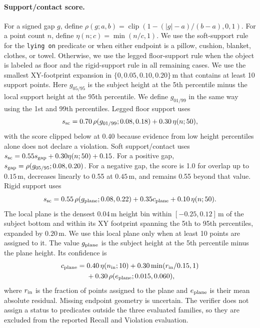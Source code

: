 \paragraph{Support/contact score.}
For a signed gap \(g\), define
\(\rho(g;a,b)=\operatorname{clip}(1-(|g|-a)/(b-a),0,1)\). For a point count \(n\), define \(\eta(n;c)=\min(n/c,1)\).
We use the soft-support rule for the \texttt{lying on} predicate or when either endpoint is a pillow, cushion, blanket, clothes, or towel. Otherwise, we use the legged floor-support rule when the object is labeled as floor and the rigid-support rule in all remaining cases.
We use the smallest XY-footprint expansion in \(\{0,0.05,0.10,0.20\}\,\mathrm m\) that contains at least 10 support points. Here \(g_{05/95}\) is the subject height at the 5th percentile minus the local support height at the 95th percentile. We define \(g_{01/99}\) in the same way using the 1st and 99th percentiles.
Legged floor support uses
\[
s_{\rm sc}=0.70\,\rho(g_{01/99};0.08,0.18)+0.30\,\eta(n;50),
\]
with the score clipped below at 0.40 because evidence from low height percentiles alone does not declare a violation. Soft support/contact uses
\(s_{\rm sc}=0.55s_{\rm gap}+0.30\eta(n;50)+0.15\).
For a positive gap, \(s_{\rm gap}=\rho(g_{05/95};0.08,0.20)\).
For a negative gap, the score is 1.0 for overlap up to
\(0.15\,\mathrm m\), decreases linearly to 0.55 at \(0.45\,\mathrm m\), and remains 0.55 beyond that value.
Rigid support uses
\[
s_{\rm sc}=0.55\,\rho(g_{\rm plane};0.08,0.22)
+0.35c_{\rm plane}+0.10\,\eta(n;50).
\]
The local plane is the densest \(0.04\,\mathrm m\) height bin within \([-0.25,0.12]\,\mathrm m\) of the subject bottom and within its XY footprint spanning the 5th to 95th percentiles, expanded by \(0.20\,\mathrm m\). We use this local plane only when at least 10 points are assigned to it. The value \(g_{\rm plane}\) is the subject height at the 5th percentile minus the plane height. Its confidence is
\[
\begin{aligned}
c_{\rm plane}={}&0.40\,\eta(n_{\rm in};10)
+0.30\min(r_{\rm in}/0.15,1)\\
&+0.30\,\rho(e_{\rm plane};0.015,0.060),
\end{aligned}
\]
where \(r_{\rm in}\) is the fraction of points assigned to the plane and \(e_{\rm plane}\) is their mean absolute residual. Missing endpoint geometry is uncertain. The verifier does not assign a status to predicates outside the three evaluated families, so they are excluded from the reported Recall and Violation evaluation.

